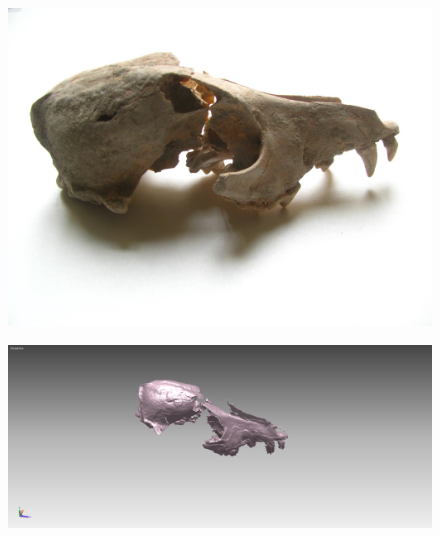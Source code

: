 \documentclass{beamer}
\begin{document}
		\begin{frame}
			\begin{multicols}{2}[][]
				\begin{figure}[]
					\begin{center}
						\includegraphics[width=1\linewidth]{snap3d/cane1}
					\end{center}
					\label{fig:cane1}
				\end{figure}
				\begin{figure}[]
					\begin{center}
						\includegraphics[width=1\linewidth,trim=200 0 200 0,clip=true]{snap3d/cane2}
					\end{center}
					\label{fig:cane2}
				\end{figure}
			\end{multicols}
		\end{frame}
\end{document}
